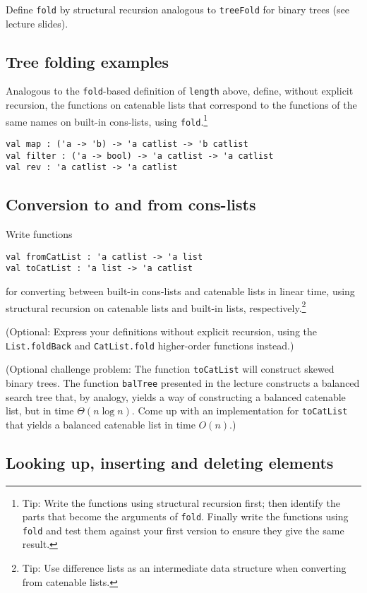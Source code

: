\documentclass[a4paper,11pt]{article}
\begin{document}
Define \verb|fold| by structural recursion analogous to \verb|treeFold| for binary trees (see lecture slides).

\subsection{Tree folding examples}

Analogous to the \verb|fold|-based definition of \verb|length| above, define, without explicit recursion, the functions on catenable lists that correspond to the functions of the same names on built-in cons-lists, using \verb|fold|.\footnote{Tip: Write the functions using structural recursion first; then identify the parts that become the arguments of \texttt{fold}. Finally write the functions using \texttt{fold} and test them against your first version to ensure they give the same result.}  
\begin{verbatim}
val map : ('a -> 'b) -> 'a catlist -> 'b catlist 
val filter : ('a -> bool) -> 'a catlist -> 'a catlist 
val rev : 'a catlist -> 'a catlist
\end{verbatim}

\subsection{Conversion to and from cons-lists}

Write functions
\begin{verbatim}
val fromCatList : 'a catlist -> 'a list
val toCatList : 'a list -> 'a catlist
\end{verbatim}
for converting between built-in cons-lists and catenable lists in linear time, using structural recursion on catenable lists and built-in lists, respectively.\footnote{Tip: Use difference lists as an intermediate data structure when converting from catenable lists.}

(Optional: Express your definitions without explicit recursion, using the \texttt{List.foldBack} and \texttt{CatList.fold} higher-order functions instead.)

(Optional challenge problem: The function \verb|toCatList| will construct skewed binary trees.  The function \verb|balTree| presented in the lecture constructs a balanced search tree that, by analogy, yields a way of constructing a balanced catenable list, but in time $\Theta(n \log n)$.  Come up with an implementation for \verb|toCatList| that yields a balanced catenable list in time $O(n)$.)

\subsection{Looking up, inserting and deleting elements}
\end{document}
